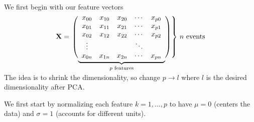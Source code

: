 We first begin with our feature vectors
$$\mathbf{X} = \left.\left( 
                  \vphantom{\begin{array}{c}1\\1\\1\\1\\1\end{array}}
                  \smash{\underbrace{
                      \begin{array}{ccccc}
                             x_{00}&x_{10}&x_{20}&\cdots &x_{p0}\\
                             x_{01}&x_{11}&x_{21}&\cdots &x_{p1}\\
                             x_{02}&x_{12}&x_{22}&\cdots &x_{p2}\\
                             \vdots&&&\ddots&\\
                             x_{0n}&x_{1n}&x_{2n}&\cdots &x_{pn}
                      \end{array}
                      }_{p\text{ features}}}
              \right)\right\}
              \,n\text{ events}
$$\\

The idea is to shrink the dimensionality, so change $p\rightarrow l$ where $l$ is the desired dimensionality after PCA. 

We first start by normalizing each feature $k=1,\dots,p$ to have $\mu=0$ (centers the data) and $\sigma=1$ (accounts for different units).

